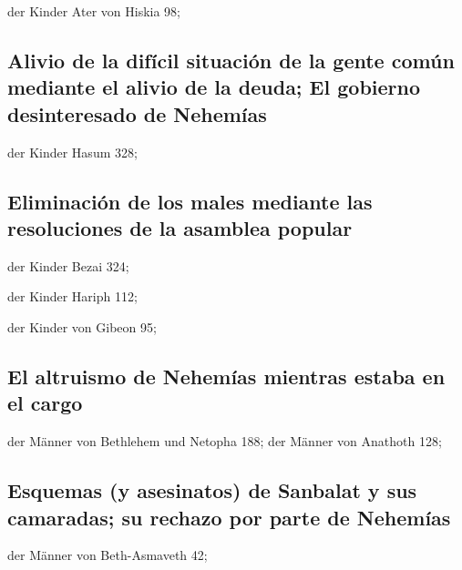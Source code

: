  der Kinder Ater von Hiskia 98;

\hypertarget{alivio-de-la-difuxedcil-situaciuxf3n-de-la-gente-comuxfan-mediante-el-alivio-de-la-deuda-el-gobierno-desinteresado-de-nehemuxedas}{%
\subsection{Alivio de la difícil situación de la gente común mediante el
alivio de la deuda; El gobierno desinteresado de
Nehemías}\label{alivio-de-la-difuxedcil-situaciuxf3n-de-la-gente-comuxfan-mediante-el-alivio-de-la-deuda-el-gobierno-desinteresado-de-nehemuxedas}}

 der Kinder Hasum 328;

\hypertarget{eliminaciuxf3n-de-los-males-mediante-las-resoluciones-de-la-asamblea-popular}{%
\subsection{Eliminación de los males mediante las resoluciones de la
asamblea
popular}\label{eliminaciuxf3n-de-los-males-mediante-las-resoluciones-de-la-asamblea-popular}}

 der Kinder Bezai 324;

 der Kinder Hariph 112;

 der Kinder von Gibeon 95;

\hypertarget{el-altruismo-de-nehemuxedas-mientras-estaba-en-el-cargo}{%
\subsection{El altruismo de Nehemías mientras estaba en el
cargo}\label{el-altruismo-de-nehemuxedas-mientras-estaba-en-el-cargo}}

 der Männer von Bethlehem und Netopha 188;
 der Männer von Anathoth 128;

\hypertarget{esquemas-y-asesinatos-de-sanbalat-y-sus-camaradas-su-rechazo-por-parte-de-nehemuxedas}{%
\subsection{Esquemas (y asesinatos) de Sanbalat y sus camaradas; su
rechazo por parte de
Nehemías}\label{esquemas-y-asesinatos-de-sanbalat-y-sus-camaradas-su-rechazo-por-parte-de-nehemuxedas}}

 der Männer von Beth-Asmaveth 42;

